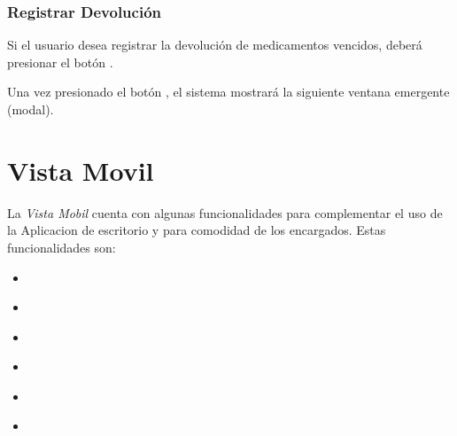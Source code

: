 \documentclass[a4paper,10pt,spanish]{sphinxmanual}
\begin{document}
\subsection{Registrar Devolución}
\label{devolucionvencidos:registrar-devolucion}\label{devolucionvencidos:id1}
Si el usuario desea registrar la devolución de medicamentos vencidos, deberá presionar el botón .


Una vez presionado el botón , el sistema mostrará la siguiente ventana emergente (modal).



\chapter{Vista Movil}
\label{vistamovil::doc}\label{vistamovil:vista-movil}
La \emph{Vista Mobil} cuenta con algunas funcionalidades para complementar el uso de la Aplicacion de escritorio y para comodidad de los encargados.
Estas funcionalidades son:
\begin{itemize}
\item {} 
{\hyperref[vistamovil:pantalla\string-princ]{}}

\item {} 
{\hyperref[vistamovil:medicamentos]{}}

\item {} 
{\hyperref[vistamovil:anadir\string-pedido]{}}

\item {} 
{\hyperref[vistamovil:organizaciones]{}}

\item {} 
{\hyperref[vistamovil:pedidos]{}}

\item {} 
{\hyperref[vistamovil:info]{}}

\end{itemize}
\end{document}

